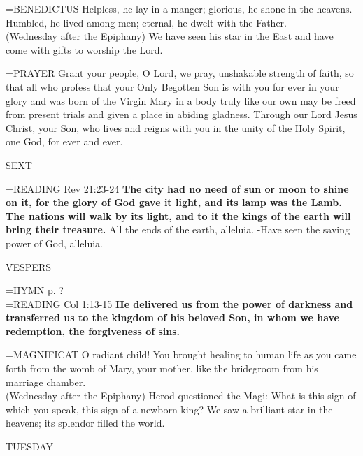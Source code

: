 \hangindent=\parindent \small{BENEDICTUS 	Helpless, he lay in a manger; glorious, he shone in the heavens. Humbled, he lived among men; eternal, he dwelt with the Father.\\}
(Wednesday after the Epiphany)
We have seen his star in the East and have come with gifts to worship the Lord.

\hangindent=\parindent \small{PRAYER 	Grant your people, O Lord, we pray, unshakable strength of faith, so that all who profess that your Only Begotten Son is with you for ever in your glory and was born of the Virgin Mary in a body truly like our own may be freed from present trials and given a place in abiding gladness. Through our Lord Jesus Christ, your Son, who lives and reigns with you in the unity of the Holy Spirit, one God, for ever and ever.}

\begin{flushleft}\normalsize SEXT\\\end{flushleft}
\hangindent=\parindent \small{READING}    Rev 21:23-24 \textbf{   The city had no need of sun or moon to shine on it, for the glory of God gave it light, and its lamp was the Lamb. The nations will walk by its light, and to it the kings of the earth will bring their treasure.}
All the ends of the earth, alleluia.
-Have seen the saving power of God, alleluia.

\begin{flushleft}\normalsize VESPERS\\\end{flushleft}
\hangindent=\parindent \small{\uppercase{HYMN} p.  ?\\}
\hangindent=\parindent \small{READING}    Col 1:13-15 \textbf{   He delivered us from the power of darkness and transferred us to the kingdom of his beloved Son, in whom we have redemption, the forgiveness of sins.\\}

\hangindent=\parindent \small{MAGNIFICAT 	O radiant child! You brought healing to human life as you came forth from the womb of Mary, your mother, like the bridegroom from his marriage chamber.\\}
(Wednesday after the Epiphany)
Herod questioned the Magi: What is this sign of which you speak, this sign of a newborn king? We saw a brilliant star in the heavens; its splendor filled the world.

\begin{center}
\normalsize TUESDAY
\end{center}

